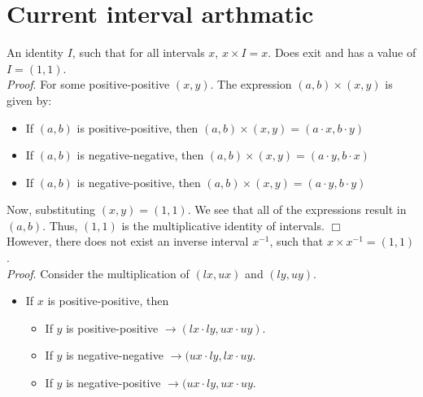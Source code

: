 \documentclass[12pt]{article}
\begin{document}
\section*{Current interval arthmatic}

An identity $I$, such that for all intervals $x$, $x \times I = x$. Does
exit and has a value of $I = (1 , 1)$. \\ 

\emph{Proof}. For some positive-positive \( (x , y) \). The expression
\( (a , b) \times (x , y) \) is given by:

\begin{itemize}
	\item If \( (a , b) \) is positive-positive, then \( (a  , b) \times
		(x , y) = (a \cdot x , b \cdot y) \) 

	\item If \( (a , b) \) is negative-negative, then \( (a  , b) \times
		(x , y) = (a \cdot y , b \cdot x) \) 

	\item If \( (a , b) \) is negative-positive, then \( (a  , b) \times
		(x , y) = (a \cdot y , b \cdot y) \) 
\end{itemize}

Now, substituting \( (x , y) = (1 , 1) \). We see that all of the
expressions result in \( (a , b) \). Thus, \( (1 , 1) \) is the
multiplicative identity of intervals.  \hfill\(\Box\)
\\

However, there does not exist an inverse interval
$x^{-1}$, such that $x \times x^{-1} = (1,1)$.
\\

\emph{Proof}. Consider the multiplication of \( (lx , ux) \) and \( (ly
, uy). \) 

\begin{itemize}
	\item If \( x \)  is positive-positive, then

		\begin{itemize}
			\item If \( y \) is positive-positive \(
				\rightarrow (lx  \cdot ly , ux  \cdot
				uy) \).
			\item If \( y \) is negative-negative \(
				\rightarrow (ux
				\cdot ly, lx \cdot uy \).

			\item If \( y \) is negative-positive \(
				\rightarrow (ux
				\cdot ly, ux \cdot uy \).
		\end{itemize}

\end{itemize}
\end{document}
